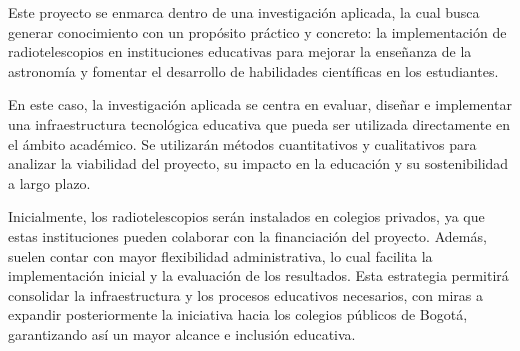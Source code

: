 Este proyecto se enmarca dentro de una investigación aplicada, la cual busca    
generar conocimiento con un propósito práctico y concreto: la implementación de 
radiotelescopios en instituciones educativas para mejorar la enseñanza de la    
astronomía y fomentar el desarrollo de habilidades científicas en los           
estudiantes.                                                                    

En este caso, la investigación aplicada se centra en evaluar, diseñar           
e implementar una infraestructura tecnológica educativa que pueda ser utilizada 
directamente en el ámbito académico. Se utilizarán métodos cuantitativos        
y cualitativos para analizar la viabilidad del proyecto, su impacto en la       
educación y su sostenibilidad a largo plazo.                                    

Inicialmente, los radiotelescopios serán instalados en colegios privados, ya    
que estas instituciones pueden colaborar con la financiación del proyecto.      
Además, suelen contar con  mayor flexibilidad administrativa, lo cual facilita  
la implementación inicial y la evaluación de los resultados. Esta estrategia    
permitirá consolidar la infraestructura y los procesos educativos necesarios,   
con miras a expandir posteriormente la iniciativa hacia los colegios públicos   
de Bogotá, garantizando así un mayor alcance e inclusión educativa.
